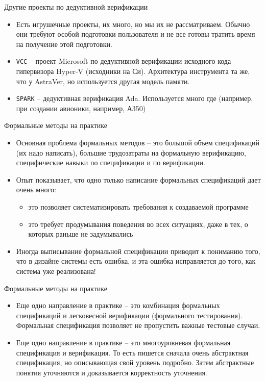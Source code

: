 \documentclass[hyperref={unicode=true}]{beamer}
\begin{document}
    \begin{frame}{Другие проекты по дедуктивной верификации}
    \begin{itemize}
    \item
    Есть игрушечные проекты, их много, но мы их не рассматриваем.
    Обычно они требуют особой подготовки пользователя и не все
    готовы тратить время на получение этой подготовки.
    \item
    \texttt{VCC} -- проект Microsoft по дедуктивной верификации
    исходного кода гипервизора Hyper-V (исходники на Си).
    Архитектура инструмента та же, что у AstraVer, но
    используется другая модель памяти.
    \item
    \texttt{SPARK} -- дедуктивная верификация Ada. Используется
    много где (например, при создании авионики, например, А350)
    \end{itemize}
    \end{frame}

    \begin{frame}{Формальные методы на практике}
    \begin{itemize}
    \item
    Основная проблема формальных методов -- это большой объем
    спецификаций (их надо написать), большие трудозатраты
    на формальную верификацию, специфические навыки по
    спецификации и по верификации.
    \item
    Опыт показывает, что одно только написание формальных
    спецификаций дает очень много:
        \begin{itemize}
        \item
        это позволяет систематизировать требования к
        создаваемой программе
        \item
        это требует продумывания поведения во всех
        ситуациях, даже в тех, о которых раньше не
        задумывались
        \end{itemize}
    \item
    Иногда выписывание формальной спецификации приводит
    к пониманию того, что в дизайне системы есть ошибка,
    и эта ошибка исправляется до того, как система
    уже реализована!
    \end{itemize}
    \end{frame}

    \begin{frame}{Формальные методы на практике}
    \begin{itemize}
    \item
    Еще одно направление в практике -- это комбинация
    формальных спецификаций и легковесной верификации
    (формального тестирования). Формальная спецификация
    позволяет не пропустить важные тестовые случаи.
    \item
    Еще одно направление в практике -- это
    многоуровневая формальная спецификация и верификация.
    То есть пишется сначала очень абстрактная спецификация,
    но описывающая свой уровень подробно. Затем
    абстрактные понятия уточняются и доказывается корректность
    уточнения.
    \end{itemize}
    \end{frame}
\end{document}
